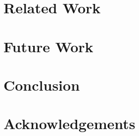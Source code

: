 \documentclass[12pt]{article}
\begin{document}
\section{Related Work} \label{sec:related}

\section{Future Work} \label{sec:future}

\section{Conclusion} \label{sec:con}

\section{Acknowledgements} \label{sec:ack}

\label{'LastPage'}
\end{document}
